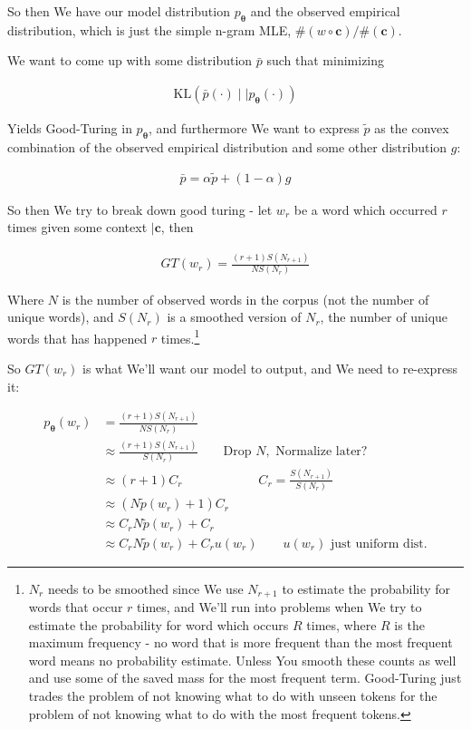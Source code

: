 \documentclass{article}
\newcommand{\KL}{\mathrm{KL}}
\newcommand{\vtheta}{\boldsymbol{\theta}}
\newcommand{\model}{p_{\vtheta}}
\newcommand{\context}{\boldsymbol{c}}
\begin{document}
		So then We have our model distribution $\model$ and the observed empirical distribution, which is just the simple n-gram MLE, $\#(w\circ\context)/\#(\context)$.
		
		We want to come up with some distribution $\bar{p}$ such that minimizing
		
		\begin{align}
			\KL(\bar{p}(\cdot) \mid\mid \model(\cdot))
		\end{align}
		
		Yields Good-Turing in $\model$, and furthermore We want to express $\tilde{p}$ as the convex combination of the observed empirical distribution and some other distribution $g$:
		
		\begin{align}
			\bar{p} = \alpha\tilde{p} + (1-\alpha)g
		\end{align}
		
		So then We try to break down good turing - let $w_r$ be a word which occurred $r$ times given some context $|\context$, then
		
		\begin{align}
			GT(w_r) = \frac{(r+1)S(N_{r+1})}{NS(N_r)}
		\end{align}
		
		Where $N$ is the number of observed words in the corpus (not the number of unique words), and $S(N_r)$ is a smoothed version of $N_r$, the number of unique words that has happened $r$ times.\footnote{$N_r$ needs to be smoothed since We use $N_{r+1}$ to estimate the probability for words that occur $r$ times, and We'll run into problems when We try to estimate the probability for word which occurs $R$ times, where $R$ is the maximum frequency - no word that is more frequent than the most frequent word means no probability estimate. Unless You smooth these counts as well and use some of the saved mass for the most frequent term. Good-Turing just trades the problem of not knowing what to do with unseen tokens for the problem of not knowing what to do with the most frequent tokens.}
		
		So $GT(w_r)$ is what We'll want our model to output, and We need to re-express it:
		
		\begin{align}
			\model(w_r) &= \frac{(r+1)S(N_{r+1})}{NS(N_r)} \\
			&\approx  \frac{(r+1)S(N_{r+1})}{S(N_r)}\qquad\text{Drop } N,\text{ Normalize later?}\\
			&\approx (r+1)C_r \qquad\qquad\qquad C_r=\frac{S(N_{r+1})}{S(N_r)}\\
			&\approx (N\tilde{p}(w_r)+1)C_r \\
			&\approx C_r N\tilde{p}(w_r) + C_r \\
			&\approx C_r N\tilde{p}(w_r) + C_r u(w_r)\qquad u(w_r)\text{ just uniform dist.} 
		\end{align}
		
\end{document}
